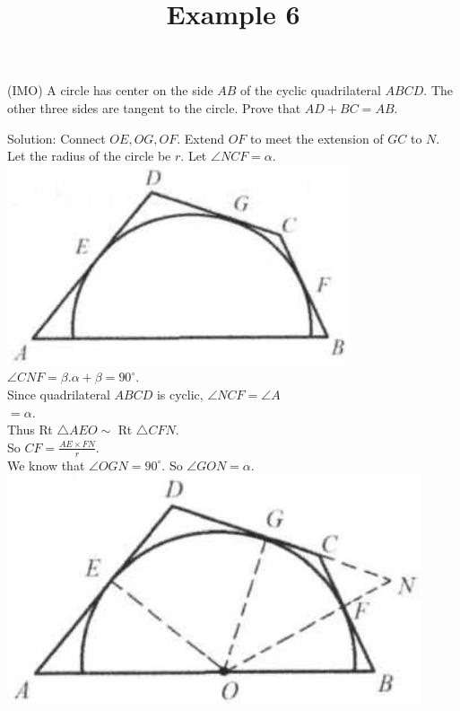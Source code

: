 \documentclass{article}
\title{Example 6}
\date{}
\begin{document}
\maketitle

(IMO) A circle has center on the side \(A B\) of the cyclic quadrilateral \(A B C D\). The other three sides are tangent to the circle. Prove that \(A D+B C=A B\).

Solution:
Connect \(O E, O G, O F\). Extend \(O F\) to meet the extension of \(G C\) to \(N\).\\
Let the radius of the circle be \(r\). Let \(\angle N C F=\alpha\).\\
\centering
\includegraphics[width=\textwidth]{images/149.jpg}\\
\(\angle C N F=\beta . \alpha+\beta=90^{\circ}\).\\
Since quadrilateral \(A B C D\) is cyclic, \(\angle N C F=\angle A\)\\
\(=\alpha\).\\
Thus Rt \(\triangle A E O \sim\) Rt \(\triangle C F N\).\\
So \(C F=\frac{A E \times F N}{r}\).\\
We know that \(\angle O G N=90^{\circ}\). So \(\angle G O N=\alpha\).\\
\centering
\includegraphics[width=\textwidth]{images/149(2).jpg}
\end{document}
